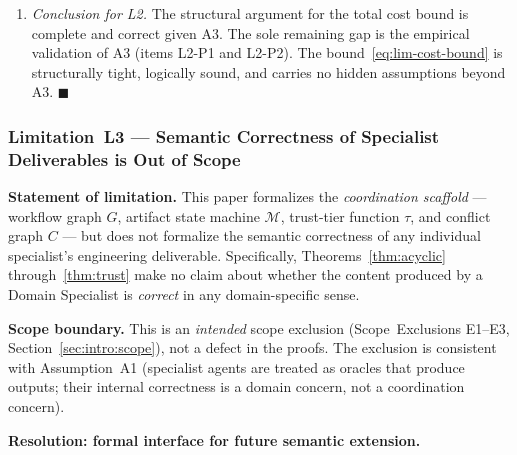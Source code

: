 \documentclass[12pt]{article}
\theoremstyle{definition}
\begin{document}
\begin{enumerate}
    \item \emph{Conclusion for L2.}
          The structural argument for the total cost bound is complete
          and correct given A3.  The sole remaining gap is the
          empirical validation of A3 (items L2-P1 and L2-P2).  The
          bound~\eqref{eq:lim-cost-bound} is structurally tight,
          logically sound, and carries no hidden assumptions beyond
          A3. $\blacksquare$
\end{enumerate}

\subsubsection*{Limitation~L3 --- Semantic Correctness of Specialist
                Deliverables is Out of Scope}
\label{sec:lim:semantic}

\noindent\textbf{Statement of limitation.}
This paper formalizes the \emph{coordination scaffold} --- workflow
graph $G$, artifact state machine $\mathcal{M}$, trust-tier function
$\tau$, and conflict graph $C$ --- but does not formalize the
semantic correctness of any individual specialist's engineering
deliverable.  Specifically, Theorems~\ref{thm:acyclic}
through~\ref{thm:trust} make no claim about whether the content
produced by a Domain Specialist is \emph{correct} in any
domain-specific sense.

\medskip
\noindent\textbf{Scope boundary.}
This is an \emph{intended} scope exclusion (Scope~Exclusions
E1--E3, Section~\ref{sec:intro:scope}), not a defect in the proofs.
The exclusion is consistent with Assumption~A1 (specialist agents
are treated as oracles that produce outputs; their internal
correctness is a domain concern, not a coordination concern).

\medskip
\noindent\textbf{Resolution: formal interface for future semantic
extension.}
\end{document}
